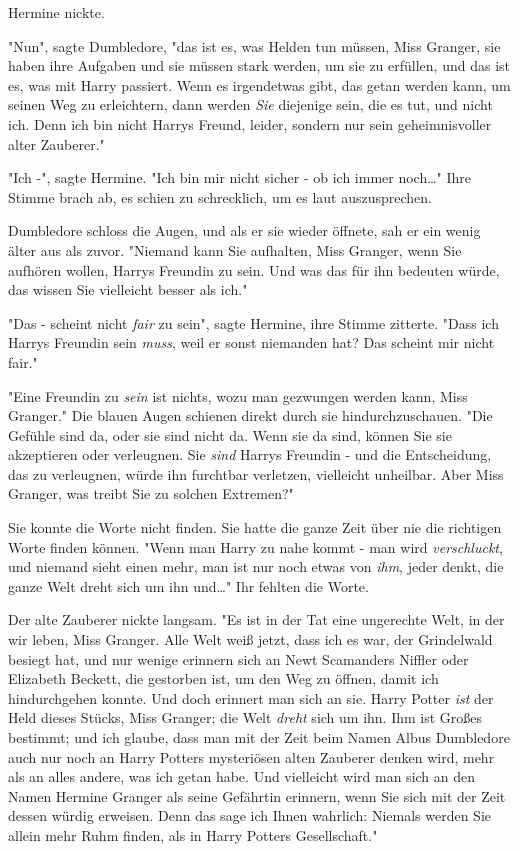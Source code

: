{Hermine nickte.

"Nun", sagte Dumbledore, "das ist es, was Helden tun müssen, Miss Granger, sie haben ihre Aufgaben und sie müssen stark werden, um sie zu erfüllen, und das ist es, was mit Harry passiert. Wenn es irgendetwas gibt, das getan werden kann, um seinen Weg zu erleichtern, dann werden \emph{Sie} diejenige sein, die es tut, und nicht ich. Denn ich bin nicht Harrys Freund, leider, sondern nur sein geheimnisvoller alter Zauberer."

"Ich -", sagte Hermine. "Ich bin mir nicht sicher - ob ich immer noch…" Ihre Stimme brach ab, es schien zu schrecklich, um es laut auszusprechen.

Dumbledore schloss die Augen, und als er sie wieder öffnete, sah er ein wenig älter aus als zuvor. "Niemand kann Sie aufhalten, Miss Granger, wenn Sie aufhören wollen, Harrys Freundin zu sein. Und was das für ihn bedeuten würde, das wissen Sie vielleicht besser als ich."

"Das - scheint nicht \emph{fair} zu sein", sagte Hermine, ihre Stimme zitterte. "Dass ich Harrys Freundin sein \emph{muss}, weil er sonst niemanden hat? Das scheint mir nicht fair."

"Eine Freundin zu \emph{sein} ist nichts, wozu man gezwungen werden kann, Miss Granger." Die blauen Augen schienen direkt durch sie hindurchzuschauen. "Die Gefühle sind da, oder sie sind nicht da. Wenn sie da sind, können Sie sie akzeptieren oder verleugnen. Sie \emph{sind} Harrys Freundin - und die Entscheidung, das zu verleugnen, würde ihn furchtbar verletzen, vielleicht unheilbar. Aber Miss Granger, was treibt Sie zu solchen Extremen?"

Sie konnte die Worte nicht finden. Sie hatte die ganze Zeit über nie die richtigen Worte finden können. "Wenn man Harry zu nahe kommt - man wird \emph{verschluckt}, und niemand sieht einen mehr, man ist nur noch etwas von \emph{ihm}, jeder denkt, die ganze Welt dreht sich um ihn und…" Ihr fehlten die Worte.

Der alte Zauberer nickte langsam. "Es ist in der Tat eine ungerechte Welt, in der wir leben, Miss Granger. Alle Welt weiß jetzt, dass ich es war, der Grindelwald besiegt hat, und nur wenige erinnern sich an Newt Scamanders Niffler oder Elizabeth Beckett, die gestorben ist, um den Weg zu öffnen, damit ich hindurchgehen konnte. Und doch erinnert man sich an sie. Harry Potter \emph{ist} der Held dieses Stücks, Miss Granger; die Welt \emph{dreht} sich um ihn. Ihm ist Großes bestimmt; und ich glaube, dass man mit der Zeit beim Namen Albus Dumbledore auch nur noch an Harry Potters mysteriösen alten Zauberer denken wird, mehr als an alles andere, was ich getan habe. Und vielleicht wird man sich an den Namen Hermine Granger als seine Gefährtin erinnern, wenn Sie sich mit der Zeit dessen würdig erweisen. Denn das sage ich Ihnen wahrlich: Niemals werden Sie allein mehr Ruhm finden, als in Harry Potters Gesellschaft."

}
